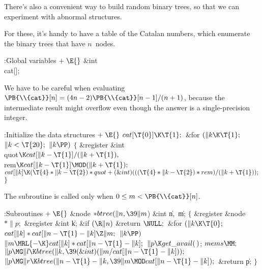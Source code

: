 There's also a convenient way to build random binary trees, so that
we can experiment with abnormal structures.

For these, it's handy to have a table of the Catalan numbers, which
enumerate the binary trees that have $n$~nodes.

\Y\B\4:Global variables\X${}\mathrel+\E{}$\6
\&{int} \\{cat}[];\par
\fi

We have to be careful when evaluating $\PB{\\{cat}}[n]=(4n-2)\PB{%
\\{cat}}[n-1]/(n+1)$,
because the intermediate result might overflow even though the answer
is a single-precision integer.

\Y\B\4:Initialize the data structures\X${}\mathrel+\E{}$\6
$\\{cat}[\T{0}]\K\T{1};{}$\6
\&{for} ${}(\|k\K\T{1};{}$ ${}\|k<\T{20};{}$ ${}\|k\PP){}$\5
${}\{{}$\1\6
\&{register} \&{int} \\{quot}${}\K\\{cat}[\|k-\T{1}]/(\|k+\T{1}),{}$ \\{rem}${}%
\K\\{cat}[\|k-\T{1}]\MOD(\|k+\T{1});{}$\7
${}\\{cat}[\|k]\K(\T{4}*\|k-\T{2})*\\{quot}+(\&{int})(((\T{4}*\|k-\T{2})*%
\\{rem})/(\|k+\T{1}));{}$\6
\4${}\}{}$\2\par
\fi

The  subroutine is called only when $0\le m<\PB{%
\\{cat}}[n]$.

\Y\B\4:Subroutines\X${}\mathrel+\E{}$\6
\&{node} ${}{*}\\{btree}(\|n,\39\|m{}$)\1\1\6
\&{int} \|n${},{}$ \|m;\2\2\6
${}\{{}$\1\6
\&{register} \&{node} ${}{*}\|p;{}$\6
\&{register} \&{int} \|k;\7
\&{if} ${}(\R\|n){}$\1\5
\&{return} ${}\NULL;{}$\2\6
\&{for} ${}(\|k\K\T{0};{}$ ${}\\{cat}[\|k]*\\{cat}[\|n-\T{1}-\|k]\Z\|m;{}$ ${}%
\|k\PP){}$\1\5
${}\|m\MRL{-{\K}}\\{cat}[\|k]*\\{cat}[\|n-\T{1}-\|k];{}$\2\6
${}\|p\K\\{get\_avail}(\,){}$;\5
${}\\{mems}\MM;{}$\6
${}\|p\MG\|l\K\\{btree}(\|k,\39(\&{int})(\|m/\\{cat}[\|n-\T{1}-\|k]));{}$\6
${}\|p\MG\|r\K\\{btree}(\|n-\T{1}-\|k,\39\|m\MOD\\{cat}[\|n-\T{1}-\|k]);{}$\6
\&{return} \|p;\6
\4${}\}{}$\2\par
\fi

